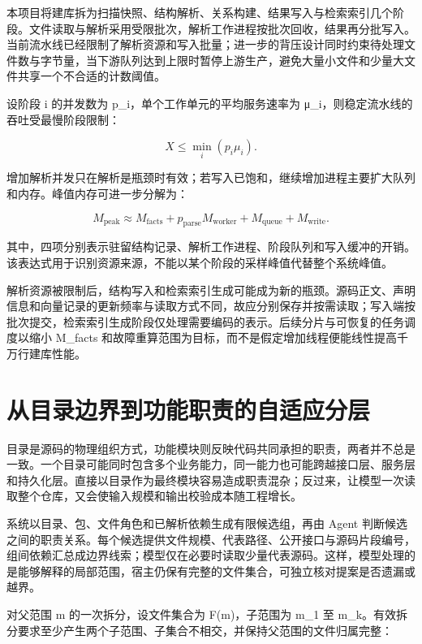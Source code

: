本项目将建库拆为扫描快照、结构解析、关系构建、结果写入与检索索引几个阶段。文件读取与解析采用受限批次，解析工作进程按批次回收，结果再分批写入。当前流水线已经限制了解析资源和写入批量；进一步的背压设计同时约束待处理文件数与字节量，当下游队列达到上限时暂停上游生产，避免大量小文件和少量大文件共享一个不合适的计数阈值。

设阶段 i 的并发数为 p\_i，单个工作单元的平均服务速率为 μ\_i，则稳定流水线的吞吐受最慢阶段限制：

\begin{equation}
X \leq \min_i\left(p_i\mu_i\right).
\end{equation}

增加解析并发只在解析是瓶颈时有效；若写入已饱和，继续增加进程主要扩大队列和内存。峰值内存可进一步分解为：

\begin{equation}
M_{\mathrm{peak}}\approx M_{\mathrm{facts}}+p_{\mathrm{parse}}M_{\mathrm{worker}}+M_{\mathrm{queue}}+M_{\mathrm{write}}.
\end{equation}

其中，四项分别表示驻留结构记录、解析工作进程、阶段队列和写入缓冲的开销。该表达式用于识别资源来源，不能以某个阶段的采样峰值代替整个系统峰值。

解析资源被限制后，结构写入和检索索引生成可能成为新的瓶颈。源码正文、声明信息和向量记录的更新频率与读取方式不同，故应分别保存并按需读取；写入端按批次提交，检索索引生成阶段仅处理需要编码的表示。后续分片与可恢复的任务调度以缩小 M\_facts 和故障重算范围为目标，而不是假定增加线程便能线性提高千万行建库性能。

\section{从目录边界到功能职责的自适应分层}

目录是源码的物理组织方式，功能模块则反映代码共同承担的职责，两者并不总是一致。一个目录可能同时包含多个业务能力，同一能力也可能跨越接口层、服务层和持久化层。直接以目录作为最终模块容易造成职责混杂；反过来，让模型一次读取整个仓库，又会使输入规模和输出校验成本随工程增长。

系统以目录、包、文件角色和已解析依赖生成有限候选组，再由 Agent 判断候选之间的职责关系。每个候选提供文件规模、代表路径、公开接口与源码片段编号，组间依赖汇总成边界线索；模型仅在必要时读取少量代表源码。这样，模型处理的是能够解释的局部范围，宿主仍保有完整的文件集合，可独立核对提案是否遗漏或越界。

对父范围 m 的一次拆分，设文件集合为 F(m)，子范围为 m\_1 至 m\_k。有效拆分要求至少产生两个子范围、子集合不相交，并保持父范围的文件归属完整：

